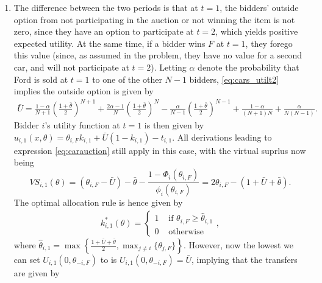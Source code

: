 \documentclass[a4paper]{article}
\begin{document}
\begin{enumerate}
		\item The difference between the two periods is that at $t=1$, the bidders' outside option from not participating in the auction or not winning the item is not zero, since they have an option to participate at $t=2$, which yields positive expected utility. At the same time, if a bidder wins $F$ at $t=1$, they forego this value (since, as assumed in the problem, they have no value for a second car, and will not participate at $t=2$).
		Letting $\alpha$ denote the probability that Ford is sold at $t=1$ to one of the other $N-1$ bidders, \eqref{eq:cars_utilt2} implies the outside option is given by
		\begin{align*}
			\bar{U} = \frac{1-\alpha}{N+1} \left(\frac{1+\bar{\theta}}{2}\right)^{N+1} + \frac{2\alpha - 1}{N} \left(\frac{1+\bar{\theta}}{2}\right)^N - \frac{\alpha}{N-1} \left(\frac{1+\bar{\theta}}{2}\right)^{N-1} + \frac{1-\alpha}{(N+1)N} + \frac{\alpha}{N(N-1)}.
		\end{align*}
		Bidder $i$'s utility function at $t=1$ is then given by $u_{i,1}(x,\theta) = \theta_{i,F} k_{i,1} + \bar{U}(1-k_{i,1}) - t_{i,1}$.
		All derivations leading to expression \eqref{eq:carauction} still apply in this case, with the virtual suprlus now being $$VS_{i,1}(\theta) = (\theta_{i,F}-\bar{U}) - \bar{\theta} - \frac{1-\Phi_i(\theta_{i,F})}{\phi_i(\theta_{i,F})} = 2\theta_{i,F} - (1+\bar{U}+\bar{\theta}).$$ 
		The optimal allocation rule is hence given by
		\begin{align*}
			k_{i,1}^*(\theta) = \begin{cases}
				1 & \text{ if } \theta_{i,F} \geq \hat{\theta}_{i,1}
				\\
				0 & \text{ otherwise}
			\end{cases},
		\end{align*}
		where $\hat{\theta}_{i,1} = \max \left\{\frac{1+\bar{U}+\bar{\theta}}{2}, \max_{j \neq i} \{ \theta_{j,F} \} \right\}$.
		However, now the lowest we can set $U_{i,1}(0,\theta_{-i,F})$ to is $U_{i,1}(0,\theta_{-i,F}) = \bar{U}$, implying that the transfers are given by
		\begin{align*}

\end{align*}
\end{enumerate}
\end{document}
